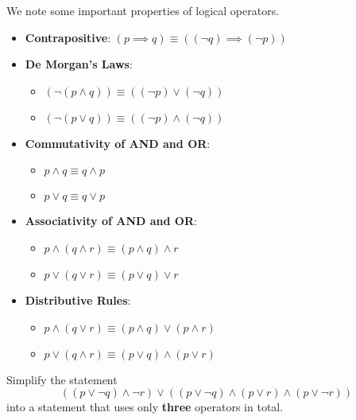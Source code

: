 We note some important properties of logical operators.
\begin{itemize}
    \item \textbf{Contrapositive}: $(p \implies q) \equiv ((\lnot q) \implies (\lnot p))$
    \item \textbf{De Morgan's Laws}: \begin{itemize}
        \item $(\lnot (p \land q)) \equiv ((\lnot p) \lor (\lnot q))$
        \item $(\lnot (p \lor q)) \equiv ((\lnot p) \land (\lnot q))$
    \end{itemize}
    \item \textbf{Commutativity of AND and OR}: \begin{itemize}
        \item $p \land q \equiv q \land p$
        \item $p \lor q \equiv q \lor p$
    \end{itemize}
    \item \textbf{Associativity of AND and OR}: \begin{itemize}
        \item $p \land (q \land r) \equiv (p \land q) \land r$
        \item $p \lor (q \lor r) \equiv (p \lor q) \lor r$
    \end{itemize}
    \item \textbf{Distributive Rules}: \begin{itemize}
        \item $p \land (q \lor r) \equiv (p \land q) \lor (p \land r)$
        \item $p \lor (q \land r) \equiv (p \lor q) \land (p \lor r)$
    \end{itemize}
\end{itemize}
\begin{exercise}
    Simplify the statement
    \[
        ((p \lor \lnot q) \land \lnot r) \lor ((p \lor \lnot q) \land (p \lor r) \land (p \lor \lnot r))
    \]
    into a statement that uses only \textbf{three} operators in total.
\end{exercise}

